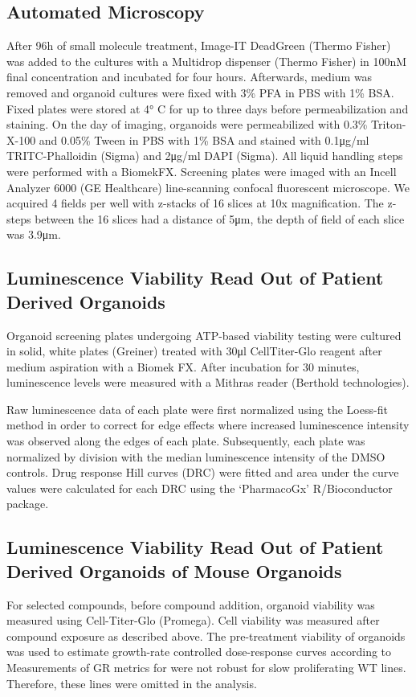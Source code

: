 \begin{flushleft}
\subsection{Automated Microscopy}
After 96h of small molecule treatment, Image-IT DeadGreen (Thermo Fisher) was added to the cultures with a Multidrop dispenser (Thermo Fisher) in 100nM final concentration and incubated for four hours. Afterwards, medium was removed and organoid cultures were fixed with 3\% PFA in PBS with 1\% BSA. Fixed plates were stored at 4° C for up to three days before permeabilization and staining. On the day of imaging, organoids were permeabilized with 0.3\% Triton-X-100 and 0.05\% Tween in PBS with 1\% BSA and stained with 0.1μg/ml TRITC-Phalloidin (Sigma) and 2μg/ml DAPI (Sigma). All liquid handling steps were performed with a BiomekFX. Screening plates were imaged with an Incell Analyzer 6000 (GE Healthcare) line-scanning confocal fluorescent microscope. We acquired 4 fields per well with z-stacks of 16 slices at 10x magnification. The z-steps between the 16 slices had a distance of 5μm, the depth of field of each slice was 3.9μm.

\subsection{Luminescence Viability Read Out of Patient Derived Organoids}
Organoid screening plates undergoing ATP-based viability testing were cultured in solid, white plates (Greiner) treated with 30μl CellTiter-Glo reagent after medium aspiration with a Biomek FX. After incubation for 30 minutes, luminescence levels were measured with a Mithras reader (Berthold technologies).

Raw luminescence data of each plate were first normalized using the Loess-fit method in order to correct for edge effects where increased luminescence intensity was observed along the edges of each plate. Subsequently, each plate was normalized by division with the median luminescence intensity of the DMSO controls. Drug response Hill curves (DRC) were fitted and area under the curve values were calculated for each DRC using the ‘PharmacoGx’ \parencite{smirnovPharmacoGxPackageAnalysis2016} R/Bioconductor package.

\subsection{Luminescence Viability Read Out of Patient Derived Organoids of Mouse Organoids}
For selected compounds, before compound addition, organoid viability was measured using Cell-Titer-Glo (Promega). Cell viability was measured after compound exposure as described above. The pre-treatment viability of organoids was used to estimate growth-rate controlled dose-response curves according to \parencite{hafnerGrowthRateInhibition2016} Measurements of GR metrics for were not robust for slow proliferating WT lines. Therefore, these lines were omitted in the analysis.


\end{flushleft}

